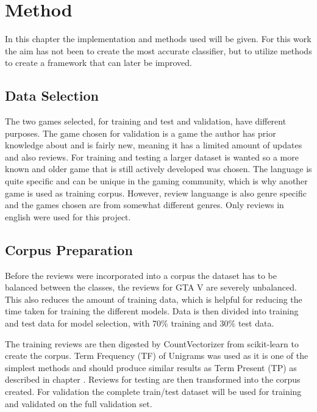 \chapter{Method}
\label{cha:method}


In this chapter the implementation and methods used will be given. 
For this work the aim has not been to create the most accurate classifier, but to utilize methods to create a framework that can later be improved.


\section{Data Selection}
\label{sec:data-selection}


The two games selected, for training and test and validation, have different purposes. 
The game chosen for validation is a game the author has prior knowledge about and is fairly new, meaning it has a limited amount of updates and also reviews. 
For training and testing a larger dataset is wanted so a more known and older game that is still actively developed was chosen. 
The language is quite specific and can be unique in the gaming community, which is why another game is used as training corpus. 
However, review languange is also genre specific and the games chosen are from somewhat different genres.
Only reviews in english were used for this project.


\section{Corpus Preparation}
\label{sec:corpus-preparation}


Before the reviews were incorporated into a corpus the dataset has to be balanced between the classes, the reviews for GTA V are severely unbalanced.
This also reduces the amount of training data, which is helpful for reducing the time taken for training the different models.
Data is then divided into training and test data for model selection, with 70\% training and 30\% test data.


The training reviews are then digested by CountVectorizer from scikit-learn to create the corpus. 
Term Frequency (TF) of Unigrams was used as it is one of the simplest methods and should produce similar results as Term Present (TP) as described in chapter . 
Reviews for testing are then transformed into the corpus created. 
For validation the complete train/test dataset will be used for training and validated on the full validation set.


